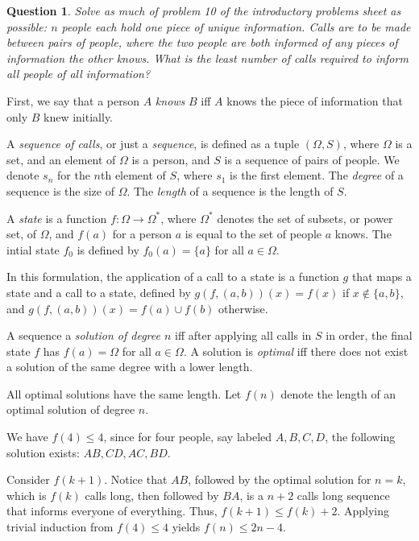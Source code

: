 \documentclass[12pt]{article}
\theoremstyle{customstyle}
\newtheorem{question}{Question}
\begin{document}
\begin{question}
    Solve as much of problem 10 of the introductory problems sheet as possible:
    $n$ people each hold one piece of unique information.
    Calls are to be made between pairs of people, where
    the two people are both informed of any pieces of information
    the other knows.
    What is the least number of calls required to inform
    all people of all information?
\end{question}

First, we say that a person $A$ \emph{knows} $B$ iff
$A$ knows the piece of information that only $B$ knew initially.

A \emph{sequence of calls}, or just a \emph{sequence},
is defined as a tuple $(\Omega, S)$,
where $\Omega$ is a set, and an element of $\Omega$ is a person,
and $S$ is a sequence of pairs of people.
We denote $s_n$ for the $n$th element of $S$, where $s_{1}$ is the first element.
The \emph{degree} of a sequence is the size of $\Omega$.
The \emph{length} of a sequence is the length of $S$.

A \emph{state} is a function $f : \Omega \to \Omega^{*}$,
where $\Omega^{*}$ denotes the set of subsets, or power set, of $\Omega$,
and $f(a)$ for a person $a$ is equal to the set of people $a$ knows.
The intial state $f_{0}$ is defined by $f_{0}(a) = \{a\}$ for all $a \in \Omega$.

In this formulation, the application of a call to a state
is a function $g$ that maps a state and a call to a state,
defined by $g(f,(a,b))(x) = f(x)$ if $x \notin \{a,b\}$,
and $g(f,(a,b))(x) = f(a) \cup f(b)$ otherwise.

A sequence a \emph{solution of degree $n$} iff
after applying all calls in $S$ in order,
the final state $f$ has $f(a) = \Omega$ for all $a \in \Omega$.
A solution is \emph{optimal} iff there does not exist
a solution of the same degree with a lower length.

All optimal solutions have the same length.
Let $f(n)$ denote the length of an optimal solution of degree $n$.

We have $f(4) \le 4$, since for four people,
say labeled $A,B,C,D$, the following solution exists: $AB, CD, AC, BD$.

Consider $f(k+1)$.
Notice that $AB$, followed by the optimal solution
for $n=k$, which is $f(k)$ calls long, then followed by $BA$,
is a $n+2$ calls long sequence that informs everyone of everything.
Thus, $f(k+1) \le f(k) + 2$.
Applying trivial induction from $f(4) \le 4$ yields $f(n) \le 2n - 4$.
\end{document}
